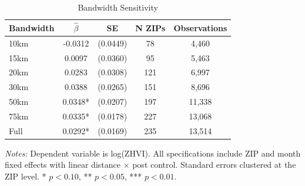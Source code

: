 \begin{table}[H]
\centering
\caption{Bandwidth Sensitivity}
\label{tab:bandwidth}
\begin{threeparttable}
\begin{tabular}{lcccc}
\toprule
Bandwidth & $\hat{\beta}$ & SE & N ZIPs & Observations \\
\midrule
10km & -0.0312 & (0.0449) & 78 & 4,460 \\
15km & 0.0097 & (0.0360) & 95 & 5,463 \\
20km & 0.0283 & (0.0308) & 121 & 6,997 \\
30km & 0.0388 & (0.0265) & 151 & 8,696 \\
50km & 0.0348* & (0.0207) & 197 & 11,338 \\
75km & 0.0335* & (0.0178) & 227 & 13,068 \\
Full & 0.0292* & (0.0169) & 235 & 13,514 \\
\bottomrule
\end{tabular}
\begin{tablenotes}[flushleft]
\small
\item \textit{Notes:} Dependent variable is log(ZHVI). All specifications include ZIP and month fixed effects with linear distance $\times$ post control. Standard errors clustered at the ZIP level. * $p<0.10$, ** $p<0.05$, *** $p<0.01$.
\end{tablenotes}
\end{threeparttable}
\end{table}
